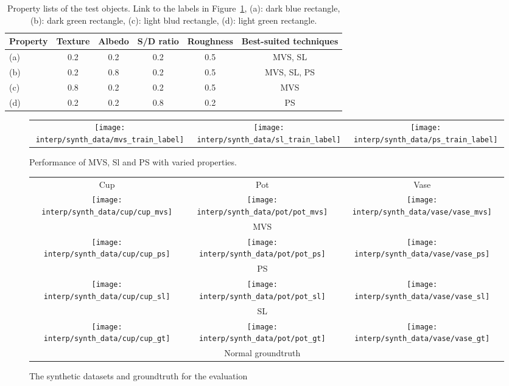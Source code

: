 \begin{table}[h]
  \centering
  \begin{tabular}{l*{5}{c}}
  \hline
  \textbf{Property} & Texture & Albedo & S/D ratio & Roughness & Best-suited techniques\\
  \hline
  (a) & 0.2 & 0.2 & 0.2 & 0.5 & MVS, SL\\
  (b) & 0.2 & 0.8 & 0.2 & 0.5 & MVS, SL, PS\\
  (c) & 0.8 & 0.2 & 0.2 & 0.5 & MVS\\
  (d) & 0.2 & 0.2 & 0.8 & 0.2 & PS\\
  \hline
  \end{tabular}
  \label{tab:prop_list_synth_data}
  \caption{Property lists of the test objects. Link to the labels in Figure~\ref{fig:training_labeled}, (a): dark blue rectangle, (b): dark green rectangle, (c): light blud rectangle, (d): light green rectangle.}
\end{table}

\begin{figure}[h!]
\centering
\begin{tabular}{ccc}
  \texttt{[image: interp/synth\_data/mvs\_train\_label]}&
  \texttt{[image: interp/synth\_data/sl\_train\_label]}&
  \texttt{[image: interp/synth\_data/ps\_train\_label]}\\
\end{tabular}
\caption{Performance of MVS, Sl and PS with varied properties.}
\label{fig:training_labeled}
\end{figure}

\begin{figure}[h!]
\centering
\begin{tabular}{ccc}
  Cup & Pot & Vase\\
  \texttt{[image: interp/synth\_data/cup/cup\_mvs]}&
  \texttt{[image: interp/synth\_data/pot/pot\_mvs]}&
  \texttt{[image: interp/synth\_data/vase/vase\_mvs]}\\
  ~ & MVS & ~\\
  \texttt{[image: interp/synth\_data/cup/cup\_ps]}&
  \texttt{[image: interp/synth\_data/pot/pot\_ps]}&
  \texttt{[image: interp/synth\_data/vase/vase\_ps]}\\
  ~ & PS & ~\\
  \texttt{[image: interp/synth\_data/cup/cup\_sl]}&
  \texttt{[image: interp/synth\_data/pot/pot\_sl]}&
  \texttt{[image: interp/synth\_data/vase/vase\_sl]}\\
  ~ & SL & ~\\
  \texttt{[image: interp/synth\_data/cup/cup\_gt]}&
  \texttt{[image: interp/synth\_data/pot/pot\_gt]}&
  \texttt{[image: interp/synth\_data/vase/vase\_gt]}\\
  ~ & Normal groundtruth & ~\\
\end{tabular}
\caption{The synthetic datasets and groundtruth for the evaluation}
\label{fig:synth_data}
\end{figure}

